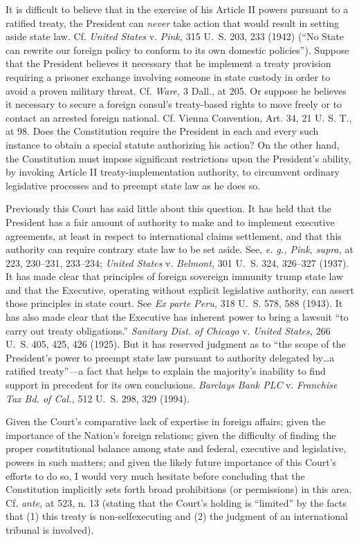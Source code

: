   It is difficult to believe that in the exercise of his Article II
powers pursuant to a ratified treaty, the President can \emph{never}
take action that would result in setting aside state law. Cf.
\emph{United States} v. \emph{Pink,} 315 U.~S. 203, 233 (1942) (``No
State can rewrite our foreign policy to conform to its own domestic
policies''). Suppose that the President believes it necessary that
he implement a treaty provision requiring a prisoner exchange involving
someone in state custody in order to avoid a proven military threat.
Cf. \emph{Ware,} 3 Dall., at 205. \newpage  Or suppose he believes
it necessary to secure a foreign consul's treaty-based rights to
move freely or to contact an arrested foreign national. Cf. Vienna
Convention, Art. 34, 21 U. S. T., at 98. Does the Constitution require
the President in each and every such instance to obtain a special
statute authorizing his action? On the other hand, the Constitution
must impose significant restrictions upon the President's ability,
by invoking Article II treaty-implementation authority, to circumvent
ordinary legislative processes and to preempt state law as he does so.

  Previously this Court has said little about this question. It has
held that the President has a fair amount of authority to make and to
implement executive agreements, at least in respect to international
claims settlement, and that this authority can require contrary state
law to be set aside. See, \emph{e. g., Pink, supra,} at 223, 230--231,
233--234; \emph{United States} v. \emph{Belmont,} 301 U.~S. 324, 326--327
(1937). It has made clear that principles of foreign sovereign
immunity trump state law and that the Executive, operating without
explicit legislative authority, can assert those principles in state
court. See \emph{Ex parte Peru,} 318 U.~S. 578, 588 (1943). It has
also made clear that the Executive has inherent power to bring a lawsuit
``to carry out treaty obligations.'' \emph{Sanitary Dist. of Chicago}
v. \emph{United States,} 266 U.~S. 405, 425, 426 (1925). But it has
reserved judgment as to ``the scope of the President's power to
preempt state law pursuant to authority delegated by\dots a ratified
treaty''---a fact that helps to explain the majority's inability to
find support in precedent for its own conclusions. \emph{Barclays Bank
PLC} v. \emph{Franchise Tax Bd. of Cal.,} 512 U.~S. 298, 329 (1994).

  Given the Court's comparative lack of expertise in foreign affairs;
given the importance of the Nation's foreign relations; given the
difficulty of finding the proper constitutional balance among state
and federal, executive and legislative, powers in such matters; and
given the likely future importance of this Court's efforts to do so, I
would very much \newpage  hesitate before concluding that the Constitution
implicitly sets forth broad prohibitions (or permissions) in this area.
Cf. \emph{ante,} at 523, n. 13 (stating that the Court's holding is
``limited'' by the facts that (1) this treaty is non-selfexecuting and
(2) the judgment of an international tribunal is involved).

